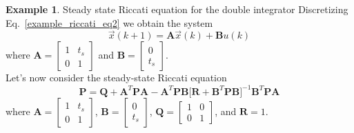 \documentclass[11pt,a4paper,oneside]{book}
\numberwithin{equation}{section}
\theoremstyle{it}
\theoremstyle{definition}
\newtheorem{example}{Example}[chapter]
\begin{document}
\begin{example}{Steady state Riccati equation for the double integrator}
Discretizing Eq.~\eqref{example_riccati_eq2} we obtain the system
\begin{equation}\label{riccati_init_3}
	\vec{x}(k+1)={\mathbf{A}}\vec{x}(k)+{\mathbf{B}}u(k)
\end{equation}
where $\mathbf{A}=\begin{bmatrix}1&t_s\\0&1\end{bmatrix}$ and $\mathbf{B}= 
\begin{bmatrix}0\\t_s\end{bmatrix}$. \\

Let's now consider the steady-state Riccati equation
\begin{equation}\label{example_riccati_eq3}
	\mathbf{P} =\mathbf{Q}+\mathbf{A}^T\mathbf{P}\mathbf{A} 
	-\mathbf{A}^T\mathbf{P}\mathbf{B}\Big[
	\mathbf{R}+\mathbf{B}^T\mathbf{P}\mathbf{B}\Big]^{-1} \mathbf{B}^T 	
	\mathbf{P}\mathbf{A} 
\end{equation}
where
$\mathbf{A}=\begin{bmatrix}1&t_s\\0&1\end{bmatrix}$, 
$\mathbf{B}=\begin{bmatrix}0\\t_s\end{bmatrix}$, $\mathbf{Q}=\begin{bmatrix}1&0\\0&1\end{bmatrix}$,
and $\mathbf{R}=1$. \\


\end{example}
\end{document}
